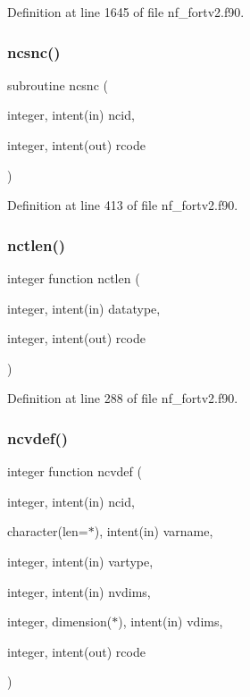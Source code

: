 Definition at line 1645 of file nf\+\_\+fortv2.\+f90.

\mbox{\label{nf__fortv2_8f90_a64e09d2a2a1ccf7e9052b111a169c2b9}} 
\subsubsection{\texorpdfstring{ncsnc()}{ncsnc()}}
{\footnotesize\ttfamily subroutine ncsnc (\begin{DoxyParamCaption}\item[{integer, intent(in)}]{ncid,  }\item[{integer, intent(out)}]{rcode }\end{DoxyParamCaption})}



Definition at line 413 of file nf\+\_\+fortv2.\+f90.

\mbox{\label{nf__fortv2_8f90_aa66c92465ffab79785ec2fcda51321c1}} 
\subsubsection{\texorpdfstring{nctlen()}{nctlen()}}
{\footnotesize\ttfamily integer function nctlen (\begin{DoxyParamCaption}\item[{integer, intent(in)}]{datatype,  }\item[{integer, intent(out)}]{rcode }\end{DoxyParamCaption})}



Definition at line 288 of file nf\+\_\+fortv2.\+f90.

\mbox{\label{nf__fortv2_8f90_a7121e237ce771e26edb350028c22f37c}} 
\subsubsection{\texorpdfstring{ncvdef()}{ncvdef()}}
{\footnotesize\ttfamily integer function ncvdef (\begin{DoxyParamCaption}\item[{integer, intent(in)}]{ncid,  }\item[{character(len=$\ast$), intent(in)}]{varname,  }\item[{integer, intent(in)}]{vartype,  }\item[{integer, intent(in)}]{nvdims,  }\item[{integer, dimension($\ast$), intent(in)}]{vdims,  }\item[{integer, intent(out)}]{rcode }\end{DoxyParamCaption})}



